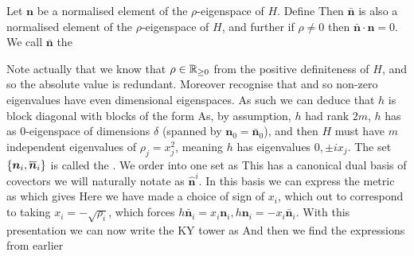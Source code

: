 \documentclass{article}
\begin{document}
\begin{lemma}
Let $\bm{n}$ be a normalised element of the $\rho$-eigenspace of $H$. Define
Then $\bar{\bm{n}}$ is also a normalised element of the $\rho$-eigenspace of $H$, and further if $\rho \neq 0$ then $\bar{\bm{n}}\cdot\bm{n} = 0$. We call $\bar{\bm{n}}$ the 
\end{lemma}

Note actually that we know that  $\rho \in \mathbb{R}_{\geq 0}$ from the positive definiteness of $H$, and so the absolute value is redundant. Moreover recognise that 
and so non-zero eigenvalues have even dimensional eigenspaces. As such we can deduce that $h$ is block diagonal with blocks of the form 
As, by assumption, $h$ had rank $2m$, $h$ has as 0-eigenspace of dimensions $\delta$ (spanned by $\bm{n}_0 = \bar{\bm{n}}_0$), and then $H$ must have $m$ independent eigenvalues of $\rho_j= x_j^2$, meaning $h$ has eigenvalues $0, \pm ix_j$. The set $\left\{ \bm{n}_i, \overline{\bm{n}}_i \right\}$ is called the . We order into one set as 
This has a canonical dual basis of covectors we will naturally notate as $\hat{\bm{n}}^i$. In this basis we can express the metric as 
which gives 
Here we have made a choice of sign of $x_i$, which out to correspond to taking $x_i = -\sqrt{\rho_i}$, which forces $h\bar{\bm{n}}_i = x_i \bm{n}_i, h\bm{n}_i = -x_i \bar{\bm{n}}_i$.
With this presentation we can now write the KY tower as 
And then we find the expressions from earlier
\end{document}

